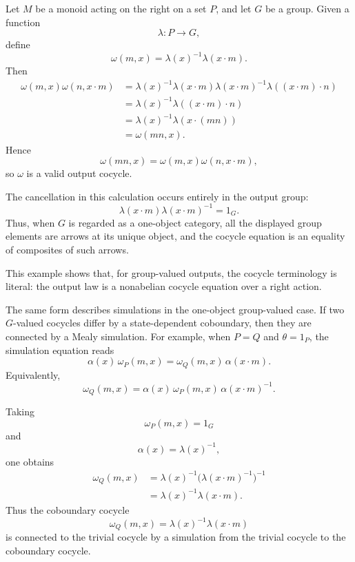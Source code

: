 \begin{example}
\label{example:group-valued-coboundary-outputs}
Let \(M\) be a monoid acting on the right on a set \(P\), and let \(G\) be a
group. Given a function
\[
    \lambda:P\to G,
\]
define
\[
    \omega(m,x)=\lambda(x)^{-1}\lambda(x\cdot m).
\]
Then
\[
\begin{aligned}
    \omega(m,x)\omega(n,x\cdot m)
    &=
    \lambda(x)^{-1}\lambda(x\cdot m)
    \lambda(x\cdot m)^{-1}\lambda((x\cdot m)\cdot n)
    \\
    &=
    \lambda(x)^{-1}\lambda((x\cdot m)\cdot n)
    \\
    &=
    \lambda(x)^{-1}\lambda(x\cdot(mn))
    \\
    &=
    \omega(mn,x).
\end{aligned}
\]
Hence
\[
    \omega(mn,x)
    =
    \omega(m,x)\omega(n,x\cdot m),
\]
so \(\omega\) is a valid output cocycle.

The cancellation in this calculation occurs entirely in the output group:
\[
    \lambda(x\cdot m)\lambda(x\cdot m)^{-1}=1_G.
\]
Thus, when \(G\) is regarded as a one-object category, all the displayed group
elements are arrows at its unique object, and the cocycle equation is an
equality of composites of such arrows.

This example shows that, for group-valued outputs, the cocycle terminology is
literal: the output law is a nonabelian cocycle equation over a right action.

The same form describes simulations in the one-object group-valued case. If
two \(G\)-valued cocycles differ by a state-dependent coboundary, then they are
connected by a Mealy simulation. For example, when \(P=Q\) and
\(\theta=1_P\), the simulation equation reads
\[
    \alpha(x)\,\omega_P(m,x)
    =
    \omega_Q(m,x)\,\alpha(x\cdot m).
\]
Equivalently,
\[
    \omega_Q(m,x)
    =
    \alpha(x)\,\omega_P(m,x)\,\alpha(x\cdot m)^{-1}.
\]

Taking
\[
    \omega_P(m,x)=1_G
\]
and
\[
    \alpha(x)=\lambda(x)^{-1},
\]
one obtains
\[
\begin{aligned}
    \omega_Q(m,x)
    &=
    \lambda(x)^{-1}
    \bigl(\lambda(x\cdot m)^{-1}\bigr)^{-1}
    \\
    &=
    \lambda(x)^{-1}\lambda(x\cdot m).
\end{aligned}
\]
Thus the coboundary cocycle
\[
    \omega_Q(m,x)=\lambda(x)^{-1}\lambda(x\cdot m)
\]
is connected to the trivial cocycle by a simulation from the trivial cocycle
to the coboundary cocycle.
\end{example}

